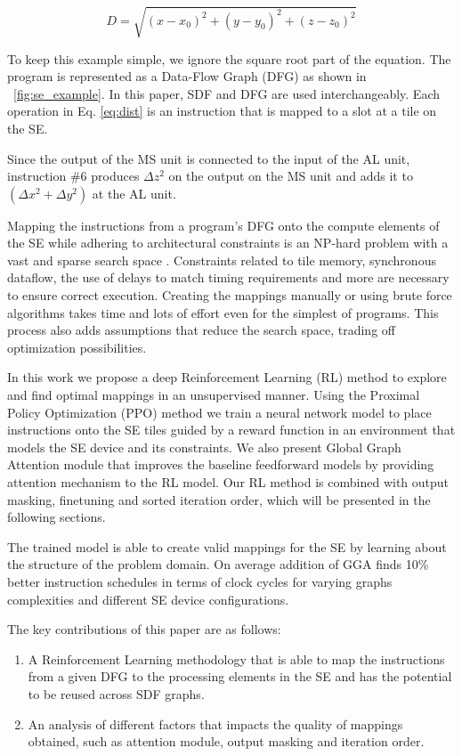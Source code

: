 \begin{equation}
    \label{eq:dist}
    D = \sqrt{(x - x_0)^2 +(y - y_0)^2 + (z - z_0)^2}
\end{equation}

To keep this example simple, we ignore the square root part of the equation.
The program is represented as a Data-Flow Graph (DFG) as shown in \figurename~\ref{fig:se_example}.
In this paper, SDF and DFG are used interchangeably.
Each operation in Eq. \ref{eq:dist} is an instruction that is mapped to a slot at a tile on the SE.

Since the output of the MS unit is connected to the input of the AL unit, instruction \#6 produces $\Delta z^2$ on the output on the MS unit and adds it to $(\Delta x^2 + \Delta y^2)$ at the AL unit.

Mapping the instructions from a program's DFG onto the compute elements of the SE while adhering to architectural constraints is an NP-hard problem with a vast and sparse search space \cite{10.1007/3-540-69346-7_30}. 
Constraints related to tile memory, synchronous dataflow, the use of delays to match timing requirements and more are necessary to ensure correct execution. 
Creating the mappings manually or using brute force algorithms takes time and lots of effort even for the simplest of programs. 
This process also adds assumptions that reduce the search space, trading off optimization possibilities.  

In this work we propose a deep Reinforcement Learning (RL) method to explore and find optimal mappings in an unsupervised manner. 
Using the Proximal Policy Optimization (PPO) method we train a neural network model to place instructions onto the SE tiles guided by a reward function in an environment that models the SE device and its constraints. 
We also present Global Graph Attention module that improves the baseline feedforward models by providing attention mechanism to the RL model.
Our RL method is combined with output masking, finetuning and sorted iteration order, which will be presented in the following sections.

The trained model is able to create valid mappings for the SE by learning about the structure of the problem domain.
On average addition of GGA finds 10\% better instruction schedules in terms of clock cycles for varying graphs complexities and different SE device configurations.

The key contributions of this paper are as follows:
\begin{enumerate}
    \item A Reinforcement Learning methodology that is able to map the instructions from a given DFG to the processing elements in the SE and has the potential to be reused across SDF graphs.
    \item An analysis of different factors that impacts the quality of mappings obtained, such as attention module, output masking and iteration order.
\end{enumerate}

